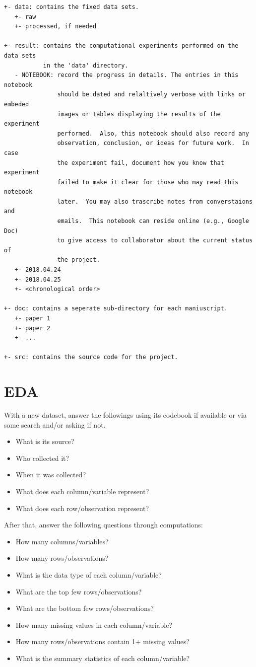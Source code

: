 \documentclass[
  letterpaper,
  DIV=11,
  numbers=noendperiod]{scrreprt}
\providecommand{\tightlist}{%
  \setlength{\itemsep}{0pt}\setlength{\parskip}{0pt}}\usepackage{longtable,booktabs,array}
\begin{document}
\begin{verbatim}
+- data: contains the fixed data sets.
   +- raw
   +- processed, if needed

+- result: contains the computational experiments performed on the data sets 
           in the 'data' directory.
   - NOTEBOOK: record the progress in details. The entries in this notebook 
               should be dated and relaltively verbose with links or embeded 
               images or tables displaying the results of the experiment 
               performed.  Also, this notebook should also record any 
               observation, conclusion, or ideas for future work.  In case 
               the experiment fail, document how you know that experiment 
               failed to make it clear for those who may read this notebook 
               later.  You may also trascribe notes from converstaions and 
               emails.  This notebook can reside online (e.g., Google Doc) 
               to give access to collaborator about the current status of 
               the project.
   +- 2018.04.24
   +- 2018.04.25
   +- <chronological order>

+- doc: contains a seperate sub-directory for each maniuscript.
   +- paper 1
   +- paper 2
   +- ...

+- src: contains the source code for the project.
\end{verbatim}

\chapter{EDA}\label{eda}

With a new dataset, answer the followings using its codebook if
available or via some search and/or asking if not.

\begin{itemize}
\tightlist
\item
  What is its source?
\item
  Who collected it?
\item
  When it was collected?
\item
  What does each column/variable represent?
\item
  What does each row/observation represent?
\end{itemize}

After that, answer the following questions through computations:

\begin{itemize}
\tightlist
\item
  How many columns/variables?
\item
  How many rows/observations?
\item
  What is the data type of each column/variable?
\item
  What are the top few rows/observations?
\item
  What are the bottom few rows/observations?
\item
  How many missing values in each column/variable?
\item
  How many rows/observations contain 1+ missing values?
\item
  What is the summary statistics of each column/variable?
\end{itemize}
\end{document}
